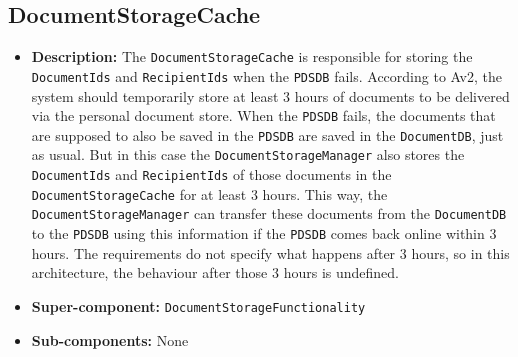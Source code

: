 \documentclass[a4paper,10pt]{article}
\begin{document}
\subsection{DocumentStorageCache}
\begin{itemize}
    \item \textbf{Description:} The \texttt{DocumentStorageCache} is responsible for storing the \texttt{DocumentIds} and \texttt{RecipientIds} when the \texttt{PDSDB} fails. According to Av2, the system should temporarily store at least 3 hours of documents to be delivered via the personal document store. When the \texttt{PDSDB} fails, the documents that are supposed to also be saved in the \texttt{PDSDB} are saved in the \texttt{DocumentDB}, just as usual. But in this case the \texttt{DocumentStorageManager} also stores the \texttt{DocumentIds} and \texttt{RecipientIds} of those documents in the \texttt{DocumentStorageCache} for at least 3 hours. This way, the \texttt{DocumentStorageManager} can transfer these documents from the \texttt{DocumentDB} to the \texttt{PDSDB} using this information if the \texttt{PDSDB} comes back online within 3 hours. The requirements do not specify what happens after 3 hours, so in this architecture, the behaviour after those 3 hours is undefined.
    \item \textbf{Super-component:} \texttt{DocumentStorageFunctionality}
    \item \textbf{Sub-components:} None
\end{itemize}
\end{document}
